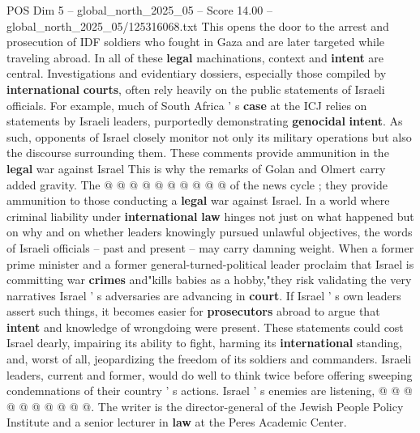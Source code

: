 \begin{textsample}{POS Dim 5 – global\_north\_2025\_05 – Score 14.00 – global\_north\_2025\_05/125316068.txt}
This opens the door to the arrest and prosecution of IDF soldiers who fought in Gaza and are later targeted while traveling abroad.
In all of these \textbf{legal} machinations, context and \textbf{intent} are central.
Investigations and evidentiary dossiers, especially those compiled by \textbf{international} \textbf{courts}, often rely heavily on the public statements of Israeli officials.
For example, much of South Africa ' s \textbf{case} at the ICJ relies on statements by Israeli leaders, purportedly demonstrating \textbf{genocidal} \textbf{intent}.
As such, opponents of Israel closely monitor not only its military operations but also the discourse surrounding them.
These comments provide ammunition in the \textbf{legal} war against Israel This is why the remarks of Golan and Olmert carry added gravity.
The @ @ @ @ @ @ @ @ @ @ of the news cycle ; they provide ammunition to those conducting a \textbf{legal} war against Israel.
In a world where criminal liability under \textbf{international} \textbf{law} hinges not just on what happened but on why and on whether leaders knowingly pursued unlawful objectives, the words of Israeli officials -- past and present -- may carry damning weight.
When a former prime minister and a former general-turned-political leader proclaim that Israel is committing war \textbf{crimes} and"kills babies as a hobby,"they risk validating the very narratives Israel ' s adversaries are advancing in \textbf{court}.
If Israel ' s own leaders assert such things, it becomes easier for \textbf{prosecutors} abroad to argue that \textbf{intent} and knowledge of wrongdoing were present.
These statements could cost Israel dearly, impairing its ability to fight, harming its \textbf{international} standing, and, worst of all, jeopardizing the freedom of its soldiers and commanders.
Israeli leaders, current and former, would do well to think twice before offering sweeping condemnations of their country ' s actions.
Israel ' s enemies are listening, @ @ @ @ @ @ @ @ @ @.
The writer is the director-general of the Jewish People Policy Institute and a senior lecturer in \textbf{law} at the Peres Academic Center.

\end{textsample}

